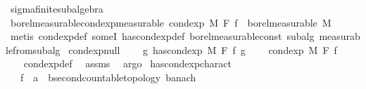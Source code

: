 \begin{isabellebody}
\endisatagproof
{\isafoldproof}%
%
\isadelimproof
%
\endisadelimproof
\isanewline
\isanewline
{}\isamarkupfalse%
\ sigma{\isacharunderscore}{\kern0pt}finite{\isacharunderscore}{\kern0pt}subalgebra\isanewline
{}\isanewline
\isanewline
{}\isamarkupfalse%
\ borel{\isacharunderscore}{\kern0pt}measurable{\isacharunderscore}{\kern0pt}cond{\isacharunderscore}{\kern0pt}exp{\isacharprime}{\kern0pt}{\isacharbrackleft}{\kern0pt}measurable{\isacharbrackright}{\kern0pt}{\isacharcolon}{\kern0pt}\ {\isachardoublequoteopen}cond{\isacharunderscore}{\kern0pt}exp\ M\ F\ f\ {\isasymin}\ borel{\isacharunderscore}{\kern0pt}measurable\ M{\isachardoublequoteclose}\isanewline
%
\isadelimproof
\ \ %
\endisadelimproof
%
\isatagproof
{}\isamarkupfalse%
\ {\isacharparenleft}{\kern0pt}metis\ cond{\isacharunderscore}{\kern0pt}exp{\isacharunderscore}{\kern0pt}def\ someI\ has{\isacharunderscore}{\kern0pt}cond{\isacharunderscore}{\kern0pt}exp{\isacharunderscore}{\kern0pt}def\ borel{\isacharunderscore}{\kern0pt}measurable{\isacharunderscore}{\kern0pt}const\ subalg\ measurable{\isacharunderscore}{\kern0pt}from{\isacharunderscore}{\kern0pt}subalg{\isacharparenright}{\kern0pt}%
\endisatagproof
{\isafoldproof}%
%
\isadelimproof
\isanewline
%
\endisadelimproof
\isanewline
{}\isamarkupfalse%
\ cond{\isacharunderscore}{\kern0pt}exp{\isacharunderscore}{\kern0pt}null{\isacharcolon}{\kern0pt}\ \isanewline
\ \ \ {\isachardoublequoteopen}{\isasymnexists}g{\isachardot}{\kern0pt}\ has{\isacharunderscore}{\kern0pt}cond{\isacharunderscore}{\kern0pt}exp\ M\ F\ f\ g{\isachardoublequoteclose}\ \isanewline
\ \ \ {\isachardoublequoteopen}cond{\isacharunderscore}{\kern0pt}exp\ M\ F\ f\ {\isacharequal}{\kern0pt}\ {\isacharparenleft}{\kern0pt}{\isasymlambda}{\isacharunderscore}{\kern0pt}{\isachardot}{\kern0pt}\ {}{\isacharparenright}{\kern0pt}{\isachardoublequoteclose}\isanewline
%
\isadelimproof
\ \ %
\endisadelimproof
%
\isatagproof
{}\isamarkupfalse%
\ cond{\isacharunderscore}{\kern0pt}exp{\isacharunderscore}{\kern0pt}def\ \isamarkupfalse%
\ assms\ \isamarkupfalse%
\ argo%
\endisatagproof
{\isafoldproof}%
%
\isadelimproof
\isanewline
%
\endisadelimproof
\isanewline
{}\isamarkupfalse%
\ has{\isacharunderscore}{\kern0pt}cond{\isacharunderscore}{\kern0pt}exp{\isacharunderscore}{\kern0pt}charact{\isacharcolon}{\kern0pt}\isanewline
\ \ \ f\ {\isacharcolon}{\kern0pt}{\isacharcolon}{\kern0pt}\ {\isachardoublequoteopen}{\isacharprime}{\kern0pt}a\ {\isasymRightarrow}\ {\isacharprime}{\kern0pt}b{\isacharcolon}{\kern0pt}{\isacharcolon}{\kern0pt}{\isacharbraceleft}{\kern0pt}second{\isacharunderscore}{\kern0pt}countable{\isacharunderscore}{\kern0pt}topology{\isacharcomma}{\kern0pt}\ banach{\isacharbraceright}{\kern0pt}{\isachardoublequoteclose}\isanewline

\end{isabellebody}
